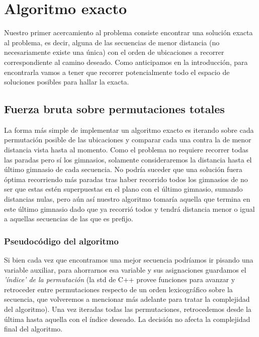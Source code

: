 \section{Algoritmo exacto}
    Nuestro primer acercamiento al problema consiste encontrar una solución exacta al problema, es decir, alguna de las secuencias de menor distancia (no necesariamente existe una única) con el orden de ubicaciones a recorrer correspondiente al camino deseado. Como anticipamos en la introducción, para encontrarla vamos a tener que recorrer potencialmente todo el espacio de soluciones posibles para hallar la exacta.
    \\

    \subsection{Fuerza bruta sobre permutaciones totales}

    La forma más simple de implementar un algoritmo exacto es iterando sobre cada permutación posible de las ubicaciones y comparar cada una contra la de menor distancia vista hasta al momento. Como el problema no requiere recorrer todas las paradas pero sí los gimnasios, solamente consideraremos la distancia hasta el último gimnasio de cada secuencia. No podría suceder que una solución fuera óptima recorriendo más paradas tras haber recorrido todos los gimnasios de no ser que estas estén superpuestas en el plano con el último gimnasio, sumando distancias nulas, pero aún así nuestro algoritmo tomaría aquella que termina en este último gimnasio dado que ya recorrió todos y tendrá distancia menor o igual a aquellas secuencias de las que es prefijo.
    \\

    \subsubsection{Pseudocódigo del algoritmo}

    Si bien cada vez que encontramos una mejor secuencia podríamos ir pisando una variable auxiliar, para ahorrarnos esa variable y sus asignaciones guardamos el \emph{'índice' de la permutación} (la std de C++ provee funciones para avanzar y retroceder entre permutaciones respecto de un orden lexicográfico sobre la secuencia, que volveremos a mencionar más adelante para tratar la complejidad del algoritmo). Una vez iteradas todas las permutaciones, retrocedemos desde la última hasta aquella con el índice deseado. La decisión no afecta la complejidad final del algoritmo.
    \\

